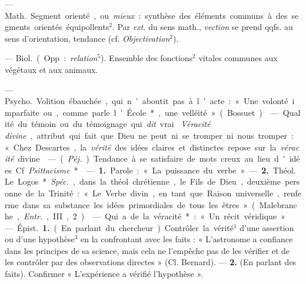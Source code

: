 \begin{itemize}[leftmargin=1cm, label=, itemsep=1pt]
 — \si{Math.} Segment orienté, ou {\it mieux} : synthèse des
éléments communs à des segments orientés équipollents$^2$. Par {\it ext.} du
sens math., {\it vection} se prend qqfs. au sens d’orientation, tendance (cf.
{\it Objectivation}$^2$).

 — \si{Biol.} (Opp. : {\it relation}$^5$). Ensemble des
fonctions$^2$ vitales communes aux végétaux et aux animaux.

 — \si{Psycho.} Volition ébauchée,
qui n'aboutit pas à l'acte : « Une
volonté imparfaite ou, comme parle l'École*, une velléité » (Bossuet).

 — Qualité du témoin ou du témoignage qui {\it dit} vrai. {\it
Véracité divine}, attribut qui fait que Dieu ne peut ni se tromper ni nous
tromper : « Chez Descartes, la {\it vérité} des idées claires et distinctes
repose sur la {\it véracité} divine.

 — ({\it Péj.}) Tendance à se satisfaire de mots creux au lieu
d'idées. Cf. {\it Psittacisme}*.

 — {\bf 1.} Parole : « La puissance du verbe. » —  {\bf 2.}
\si{Théol.} Le Logos*. {\it Spéc.}, dans la théol. chrétienne, le Fils de
Dieu, deuxième personne de la Trinité : « Le Verbe divin, en tant que Raison
universelle, renferme dans sa substance les idées primordiales de tous les
êtres » (Malebranche, {\it Entr.}, III, 2).

 — Qui a de la véracité* : « Un récit véridique. »

 — \si{Épist.} {\bf 1.} (En parlant du chercheur). Contrôler la
vérité$^1$ d’une assertion ou d’une hypothèse$^3$ en la confrontant avec les
faits : « L’astronome a confiance dans les principes de sa science, mais cela
ne l'empêche pas de les vérifier et de les contrôler par des observations
directes » (Cl. Bernard). —  {\bf 2.} (En parlant des faits). Confirmer «
L'expérience a vérifié l’hypothèse ».


\end{itemize}
